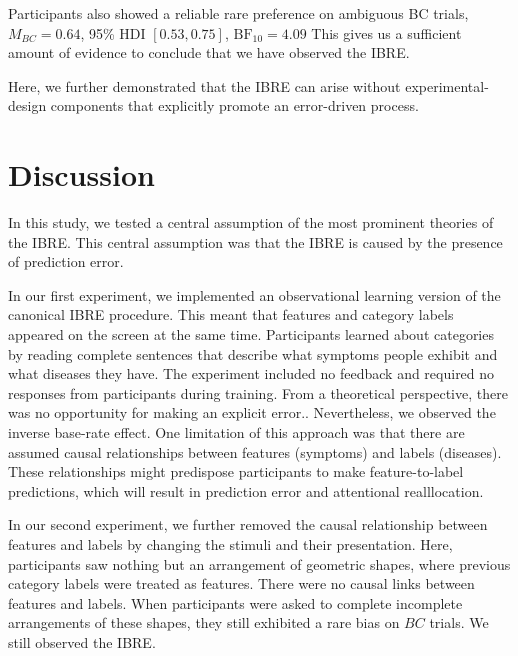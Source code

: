 \documentclass[10pt,letterpaper]{article}
\begin{document}
Participants also showed a reliable rare preference on ambiguous BC trials, $M_{BC} = 0.64$, 95\% HDI $[0.53, 0.75]$, $\mathrm{BF}_{10} = 4.09$
This gives us a sufficient amount of evidence to conclude that we have observed the IBRE.

Here, we further demonstrated that the IBRE can arise without experimental-design components that explicitly promote an error-driven process.

\section{Discussion}

In this study, we tested a central assumption of the most prominent theories of the IBRE.
This central assumption was that the IBRE is caused by the presence of prediction error.

In our first experiment, we implemented an observational learning version of the canonical IBRE procedure.
This meant that features and category labels appeared on the screen at the same time.
Participants learned about categories by reading complete sentences that describe what symptoms people exhibit and what diseases they have.
The experiment included no feedback and required no responses from participants during training.
From a theoretical perspective, there was no opportunity for making an explicit error..
Nevertheless, we observed the inverse base-rate effect.
One limitation of this approach was that there are assumed causal relationships between features (symptoms) and labels (diseases).
These relationships might predispose participants to make feature-to-label predictions, which will result in prediction error and attentional realllocation.

In our second experiment, we further removed the causal relationship between features and labels by changing the stimuli and their presentation.
Here, participants saw nothing but an arrangement of geometric shapes, where previous category labels were treated as features.
There were no causal links between features and labels.
When participants were asked to complete incomplete arrangements of these shapes, they still exhibited a rare bias on $BC$ trials.
We still observed the IBRE.

\end{document}

